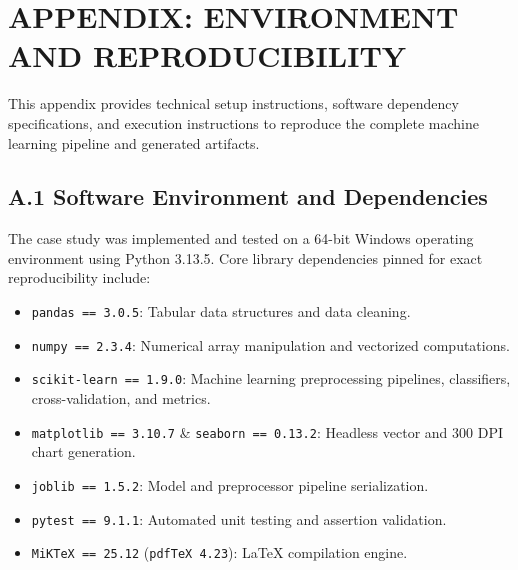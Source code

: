 \chapter*{APPENDIX: ENVIRONMENT AND REPRODUCIBILITY}

This appendix provides technical setup instructions, software dependency specifications, and execution instructions to reproduce the complete machine learning pipeline and generated artifacts.

\section*{A.1 Software Environment and Dependencies}
The case study was implemented and tested on a 64-bit Windows operating environment using Python 3.13.5. Core library dependencies pinned for exact reproducibility include:
\begin{itemize}
    \item \texttt{pandas == 3.0.5}: Tabular data structures and data cleaning.
    \item \texttt{numpy == 2.3.4}: Numerical array manipulation and vectorized computations.
    \item \texttt{scikit-learn == 1.9.0}: Machine learning preprocessing pipelines, classifiers, cross-validation, and metrics.
    \item \texttt{matplotlib == 3.10.7} \& \texttt{seaborn == 0.13.2}: Headless vector and 300 DPI chart generation.
    \item \texttt{joblib == 1.5.2}: Model and preprocessor pipeline serialization.
    \item \texttt{pytest == 9.1.1}: Automated unit testing and assertion validation.
    \item \texttt{MiKTeX == 25.12} (\texttt{pdfTeX 4.23}): LaTeX compilation engine.
\end{itemize}

